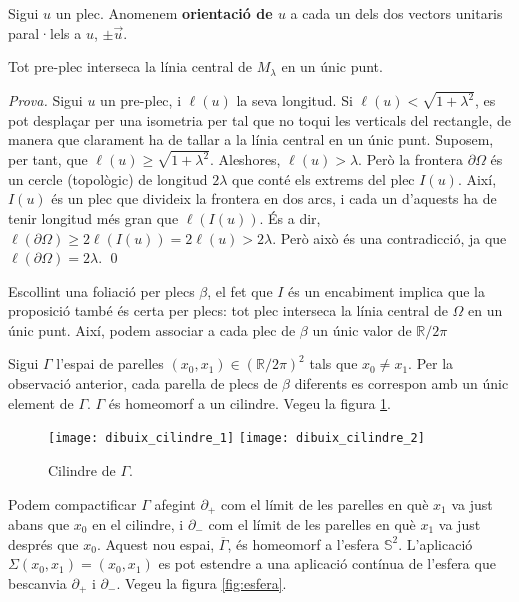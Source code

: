 \begin{defi}
    Sigui $u$ un plec. Anomenem \textbf{orientació de $u$} a cada un dels dos vectors unitaris paral·lels a $u$, $\pm \vec u$.
\end{defi}

\begin{prop}
    Tot pre-plec interseca la línia central de $M_\lambda$ en un únic punt.
\end{prop}
{
    \color{green!50!black}
    \textit{Prova.}
    Sigui $u$ un pre-plec, i $\ell(u)$ la seva longitud. Si $\ell(u)<\sqrt{1+\lambda^2}$, es pot desplaçar per una isometria per tal que no toqui les verticals del rectangle, de manera que clarament ha de tallar a la línia central en un únic punt.
    Suposem, per tant, que $\ell(u)\geq\sqrt{1+\lambda^2}$. Aleshores, $\ell(u)>\lambda$. Però la frontera $\partial \Omega$ és un cercle (topològic) de longitud $2\lambda$ que conté els extrems del plec $I(u)$. Així, $I(u)$ és un plec que divideix la frontera en dos arcs, i cada un d'aquests ha de tenir longitud més gran que $\ell(I(u))$. És a dir, $\ell(\partial \Omega) \ge  2\ell(I(u)) = 2\ell(u)>2\lambda$. Però això és una contradicció, ja que $\ell(\partial \Omega) = 2\lambda$.
    \qed
}
\begin{obs}
    Escollint una foliació per plecs $\beta$, el fet que $I$ és un encabiment implica que la proposició també és certa per plecs: tot plec interseca la línia central de $\Omega$ en un únic punt. Així, podem associar a cada plec de $\beta$ un únic valor de $\mathbb R/2\pi$
\end{obs}

Sigui $\Gamma$ l'espai de parelles $(x_0,x_1)\in(\mathbb R/2\pi)^2$ tals que $x_0\neq x_1$. Per la observació anterior, cada parella de plecs de $\beta$ diferents es correspon amb un únic element de $\Gamma$. $\Gamma$ és homeomorf a un cilindre. Vegeu la figura \ref{fig:cilindre}.

\begin{figure}[htbp]
    \centering
    \texttt{[image: dibuix\_cilindre\_1]}
    \raisebox{5\height}{$\quad\quad\Large\cong\quad$}
    \texttt{[image: dibuix\_cilindre\_2]}
    \caption{Cilindre de $\Gamma$.}
    \label{fig:cilindre}
\end{figure}

Podem compactificar $\Gamma$ afegint $\partial_+$ com el límit de les parelles en què $x_1$ va just abans que $x_0$ en el cilindre, i $\partial_-$ com el límit de les parelles en què $x_1$ va just després que $x_0$. Aquest nou espai, $\overline{\Gamma}$, és homeomorf a l'esfera $\mathbb S^2$. L'aplicació $\Sigma(x_0,x_1) = (x_0,x_1)$ es pot estendre a una aplicació contínua de l'esfera que bescanvia $\partial_+$ i $\partial_-$. Vegeu la figura \ref{fig:esfera}.

